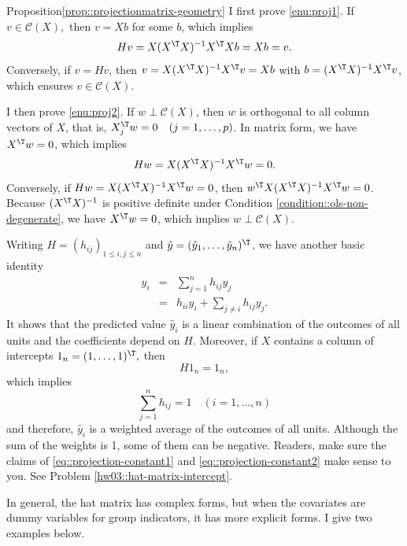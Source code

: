 \begin{myproof}{Proposition}{\ref{prop::projectionmatrix-geometry}}
I first prove \eqref{enu:proj1}.
If $v\in\mathcal{C}(X),$ then $v=Xb$ for some $b$, which implies
 $$
 Hv=X(X^{\T}X)^{-1}X^{\T}Xb=Xb=v .
 $$ 
 Conversely, if $v=Hv$, then $v=X(X^{\T}X)^{-1} X^{\T}v = Xb$ with $b=(X^{\T}X)^{-1} X^{\T}v$, which ensures $v\in \mathcal{C}(X)$. 

I then prove \eqref{enu:proj2}. 
If $w\perp\mathcal{C}(X)$, then $w$ is orthogonal to all column
vectors of $X$, that is, $X_{j}^{\T}w=0\quad(j=1,\ldots,p)$. In matrix form, we have $X^{\T}w=0$, which implies 
$$ 
Hw=X(X^{\T}X)^{-1}X^{\T}w=0.
$$ 
Conversely, if $Hw=  X(X^{\T}X)^{-1}X^{\T}w =0$, then $w^{\T} X(X^{\T}X)^{-1}X^{\T}w=0$. Because $(X^{\T}X)^{-1}$ is positive definite under Condition \ref{condition::ols-non-degenerate}, we have $X^{\T}w=0$, which implies  $w\perp\mathcal{C}(X)$. 
\end{myproof}

 

Writing $H=(h_{ij})_{1\leq i,j\leq n}$ and $\hat{y}=(\hat{y}_{1},\ldots,\hat{y}_{n})^{\T}$,
we have another basic identity 
\begin{eqnarray*}
\hat{y}_{i} &=&\sum_{j =1}^{n}h_{ij}y_{j} \\
 &=& h_{ii}y_{i}+\sum_{j\neq i}h_{ij}y_{j}.
\end{eqnarray*}
 It shows that the predicted value $\hat{y}_{i}$ is a linear combination
of  the outcomes of all units and the coefficients depend on $H$. Moreover, if $X$ contains a column of intercepts
$1_{n}=(1,\ldots,1)^{\T},$ then 
\begin{equation}\label{eq::projection-constant1}
H1_{n}=1_{n},
\end{equation}
which implies 
\begin{equation}\label{eq::projection-constant2}
\sum_{j=1}^{n}h_{ij}=1\quad(i=1,\ldots,n)
\end{equation}
and therefore, $\hat{y}_{i}$ is a weighted average of the
outcomes of all units. Although the sum of the weights is 1, some of them can be negative. Readers, make sure the claims of \eqref{eq::projection-constant1} and \eqref{eq::projection-constant2} make sense to you. See Problem \ref{hw03::hat-matrix-intercept}. 


 
In general, the hat matrix has complex forms, but when the covariates are dummy variables for group indicators, it has more explicit forms. I give two examples below. 

